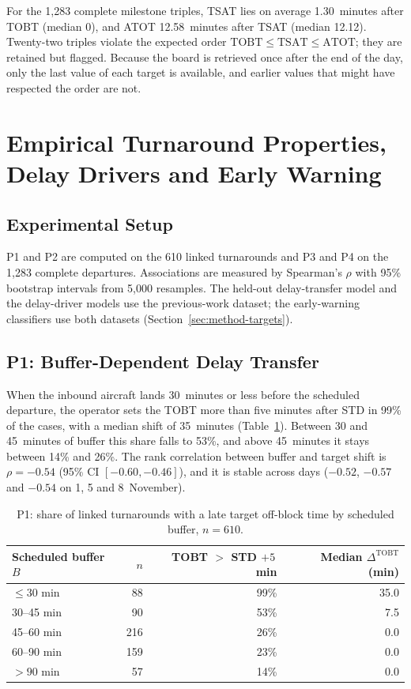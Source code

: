 For the 1,283 complete milestone triples, TSAT lies on average 1.30~minutes after TOBT (median 0), and ATOT 12.58~minutes after TSAT (median 12.12). Twenty-two triples violate the expected order $\mathrm{TOBT}\le\mathrm{TSAT}\le\mathrm{ATOT}$; they are retained but flagged. Because the board is retrieved once after the end of the day, only the last value of each target is available, and earlier values that might have respected the order are not.

\section{Empirical Turnaround Properties, Delay Drivers and Early Warning}
\label{sec:eval-props}

\subsection{Experimental Setup}
P1 and P2 are computed on the 610 linked turnarounds and P3 and P4 on the 1,283 complete departures. Associations are measured by Spearman's $\rho$ with 95\% bootstrap intervals from 5,000 resamples. The held-out delay-transfer model and the delay-driver models use the previous-work dataset; the early-warning classifiers use both datasets (Section~\ref{sec:method-targets}).

\subsection{P1: Buffer-Dependent Delay Transfer}
When the inbound aircraft lands 30~minutes or less before the scheduled departure, the operator sets the TOBT more than five minutes after STD in 99\% of the cases, with a median shift of 35~minutes (Table~\ref{tab:p1}). Between 30 and 45~minutes of buffer this share falls to 53\%, and above 45~minutes it stays between 14\% and 26\%. The rank correlation between buffer and target shift is $\rho=-0.54$ (95\% CI $[-0.60,-0.46]$), and it is stable across days ($-0.52$, $-0.57$ and $-0.54$ on 1, 5 and 8~November).

\begin{table}[htbp]\centering\small
\begin{tabular}{lrrr}\hline
Scheduled buffer $B$ & $n$ & TOBT $>$ STD $+5$\,min & Median $\Delta^{\mathrm{TOBT}}$ (min)\\\hline
$\le 30$ min & 88 & 99\% & 35.0\\
30--45 min & 90 & 53\% & 7.5\\
45--60 min & 216 & 26\% & 0.0\\
60--90 min & 159 & 23\% & 0.0\\
$>90$ min & 57 & 14\% & 0.0\\\hline
\end{tabular}
\caption{P1: share of linked turnarounds with a late target off-block time by scheduled buffer, $n=610$.}
\label{tab:p1}
\end{table}

